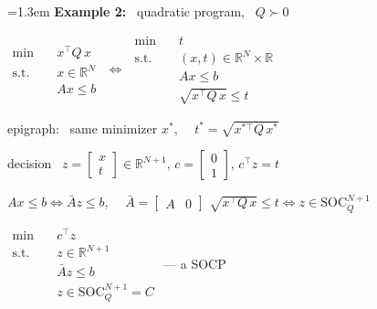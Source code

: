 \documentclass[10pt]{article}
\newenvironment{board}{%
  \par\vspace{4pt}
  \begingroup\leftskip=1.3em\relax\parskip=2pt\relax}{%
  \par\endgroup\vspace{4pt}}
\begin{document}
\begin{board}
\textbf{Example 2:} \ quadratic program, \ $Q \succ 0$
\vspace{6pt}

\begin{center}
$\begin{aligned}
  \min\quad & x^{\top}Q\,x \\
  \text{s.t.}\quad & x \in \mathbb{R}^N \\
                   & Ax \le b
\end{aligned}$
\qquad $\iff$ \qquad
$\begin{aligned}
  \min\quad & t \\
  \text{s.t.}\quad & (x, t) \in \mathbb{R}^N \times \mathbb{R} \\
                   & Ax \le b \\
                   & \sqrt{x^{\top}Q\,x} \le t
\end{aligned}$
\end{center}
\vspace{4pt}

\hspace{0.7cm}epigraph: \ same minimizer $x^*$, \ \ $t^* = \sqrt{x^{*\top}Q\,x^*}$
\vspace{10pt}

\quad decision \ $z = \begin{bmatrix} x \\ t \end{bmatrix} \in \mathbb{R}^{N+1}$, \qquad
$c = \begin{bmatrix} 0 \\ 1 \end{bmatrix}$, \qquad $c^{\top}z = t$
\vspace{8pt}

\quad $Ax \le b \iff \bar A z \le b$, \ \ $\bar A = \begin{bmatrix} A & 0 \end{bmatrix}$
\qquad\quad $\sqrt{x^{\top}Q\,x} \le t \iff z \in \mathrm{SOC}_Q^{N+1}$
\vspace{8pt}

\begin{center}
$\begin{aligned}
  \min\quad & c^{\top}z \\
  \text{s.t.}\quad & z \in \mathbb{R}^{N+1} \\
                   & \bar A z \le b \\
                   & z \in \mathrm{SOC}_Q^{N+1} = C
\end{aligned}$
\qquad --- a SOCP
\end{center}
\vspace{12pt}


\end{board}
\end{document}
